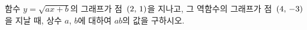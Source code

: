 \hspace*{2mm}\begin{minipage}[t]{\dimexpr\linewidth-2mm\relax}\vspace{0pt}
함수 $y=\sqrt{ax+b}$의 그래프가 점~$(2,\mkern3mu 1)$을 지나고, 그 역함수의 그래프가 점~$(4,\mkern3mu -3)$을 지날 때, 상수 $a$, $b$에 대하여 $ab$의 값을 구하시오.\end{minipage}
